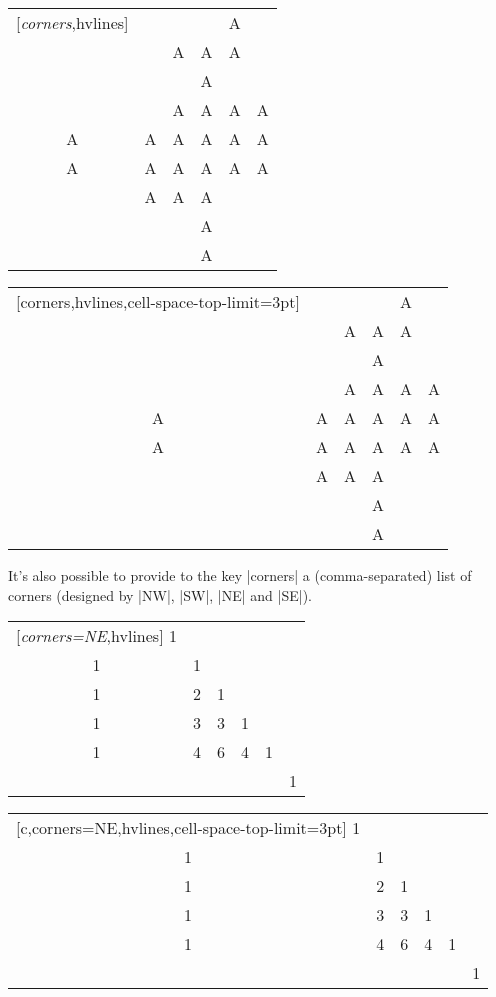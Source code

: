 \documentclass[dvipsnames]{article}%
\begin{document}
\bigskip
\begin{Code}[width=11cm]
\begin{NiceTabular}{*{6}{c}}[\emph{corners},hvlines]
  &   &   &   & A \\
  &   & A & A & A \\
  &   &   & A \\
  &   & A & A & A & A \\
A & A & A & A & A & A \\
A & A & A & A & A & A \\
  & A & A & A \\
  &  & & A \\
  &   &   & A \\
\end{NiceTabular}
\end{Code}
\begin{NiceTabular}{*{6}{c}}[corners,hvlines,cell-space-top-limit=3pt]
  &   &   &   & A \\
  &   & A & A & A \\
  &   &   & A \\
  &   & A & A & A & A \\
A & A & A & A & A & A \\
A & A & A & A & A & A \\
  & A & A & A \\
  &  & & A \\
  &   &   & A \\
\end{NiceTabular}


\bigskip
It's also possible to provide to the key |corners| a (comma-separated) list of
corners (designed by |NW|, |SW|, |NE| and |SE|).

\medskip
\begin{Code}[width=11cm]
\begin{NiceTabular}{*{6}{c}}[\emph{corners=NE},hvlines]
1\\
1&1\\
1&2&1\\
1&3&3&1\\
1&4&6&4&1\\
 & & & & &1
\end{NiceTabular}
\end{Code}
\begin{NiceTabular}{*{6}{c}}[c,corners=NE,hvlines,cell-space-top-limit=3pt]
1\\
1&1\\
1&2&1\\
1&3&3&1\\
1&4&6&4&1\\
 & & & & &1
\end{NiceTabular}
\end{document}
